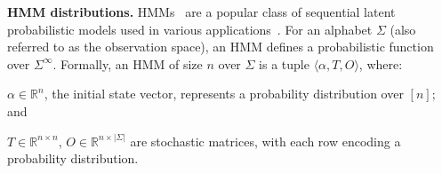 \textbf{HMM distributions.} HMMs~\citep{rabiner1986introduction} are a popular class of sequential latent probabilistic models used in various applications~\citep{knill1997hidden, de2007hidden}. For an alphabet $\Sigma$ (also referred to as the observation space), an HMM defines a probabilistic function over $\Sigma^{\infty}$. Formally, an HMM of size $n$ over $\Sigma$ is a tuple $\langle\alpha, T, O\rangle$, where: \begin{inparaenum}[(i)] \item $\alpha \in \mathbb{R}^{n}$, the initial state vector, represents a probability distribution over $[n]$; and \item $T \in \mathbb{R}^{n \times n}$, $O \in \mathbb{R}^{n \times |\Sigma|}$ are stochastic matrices, with each row encoding a probability distribution.\end{inparaenum}

    
